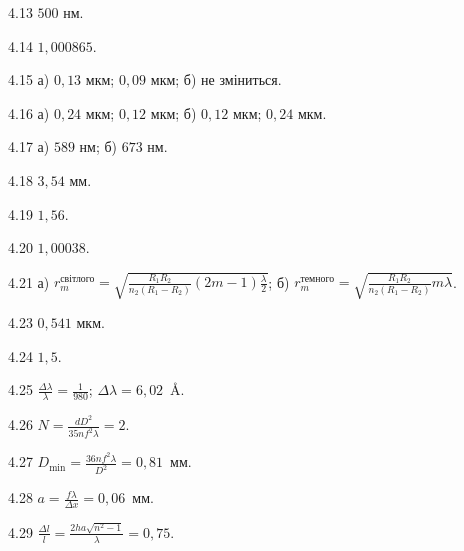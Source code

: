 \begin{Solution}{4.{13}}
	$ 500 $ нм.
\end{Solution}
\begin{Solution}{4.{14}}
	$ 1,000865 $.
\end{Solution}
\begin{Solution}{4.{15}}
	а) $ 0,13 $ мкм; $ 0,09 $ мкм; б) не зміниться.
\end{Solution}
\begin{Solution}{4.{16}}
	а) $ 0,24 $ мкм; $ 0,12 $ мкм; б) $ 0,12 $ мкм; $ 0,24 $ мкм.
\end{Solution}
\begin{Solution}{4.{17}}
	а) $ 589 $ нм; б) $ 673 $ нм.
\end{Solution}
\begin{Solution}{4.{18}}
	$ 3,54 $ мм.
\end{Solution}
\begin{Solution}{4.{19}}
	$ 1,56 $.
\end{Solution}
\begin{Solution}{4.{20}}
	$ 1,00038 $.
\end{Solution}
\begin{Solution}{4.{21}}
	а) $r_m^{\text{світлого}} = \sqrt{\frac{R_1R_2}{n_2(R_1 - R_2)} (2m-1)\frac\lambda2 }$; б)   $r_m^{\text{темного}} = \sqrt{\frac{R_1R_2}{n_2(R_1 - R_2)} m\lambda}$.
\end{Solution}
\begin{Solution}{4.{23}}
	$ 0,541 $ мкм.
\end{Solution}
\begin{Solution}{4.{24}}
	$ 1,5 $.
\end{Solution}
\begin{Solution}{4.{25}}
	$\frac{\Delta\lambda}{\lambda} = \frac1{980}$; $\Delta\lambda = 6,02$~\AA.
\end{Solution}
\begin{Solution}{4.{26}}
	$N = \frac{dD^2}{35nf^2\lambda} = 2$.
\end{Solution}
\begin{Solution}{4.{27}}
	$D_{\min} = \frac{36nf^2\lambda}{D^2} = 0,81$~мм.
\end{Solution}
\begin{Solution}{4.{28}}
	$a = \frac{f\lambda}{ \Delta x} = 0,06$~мм.
\end{Solution}
\begin{Solution}{4.{29}}
	$ \frac{\Delta l}{l}  = \frac{2ha\sqrt{n^2 - 1}}{\lambda} = 0,75$.
\end{Solution}

